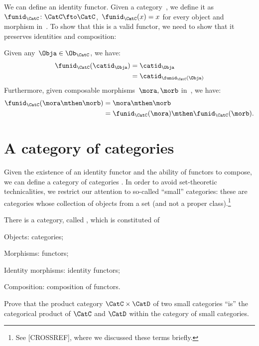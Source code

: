 We can define an identity functor. Given a category~\CatC, we define it as~$\funid_\CatC\colon \CatC \fto \CatC$,~$\funid_\CatC(x)=x$ for every object and morphism in~\CatC. To show that this is a valid functor, we need to show that it preserves identities and composition:
\begin{compactitem}
  \item Given any~$\Obja \in \Ob_\CatC$, we have:
  \begin{equation*}
    \begin{aligned}
      \funid_{\CatC}(\catid_\Obja)&=\catid_\Obja\\
      &=\catid_{\funid_{\CatC}(\Obja)}
    \end{aligned}
  \end{equation*}
  Furthermore, given composable morphisms~$\mora,\morb$ in~\CatC, we have:
  \begin{equation*}
    \begin{aligned}
      \funid_{\CatC}(\mora\mthen\morb)&=\mora\mthen\morb\\
      &=\funid_{\CatC}(\mora)\mthen \funid_{\CatC} (\morb).
    \end{aligned}
  \end{equation*}
\end{compactitem}


\section{A category of categories}

Given the existence of an identity functor and the ability of functors to compose, we can define a category of categories \Category. In order to avoid set-theoretic technicalities, we restrict our attention to so-called ``small'' categories: these are categories whose collection of objects from a set (and not a proper class).\footnote{See [CROSSREF], where we discussed these terms briefly.} 

\begin{ctdefinition}
  \label{def:Category}
  There is a category, called \Category, which is constituted of
  \begin{compactitem}
    \item Objects: categories;
    \item Morphisms: functors;
    \item Identity morphisms: identity functors;
    \item Composition: composition of functors.
  \end{compactitem}
\end{ctdefinition}

   \begin{gradedexercise}
 Prove that the product category $\CatC \times \CatD$ of two small categories ``is'' the categorical product of $\CatC$ and $\CatD$ within the category of small categories.
  \end{gradedexercise}

